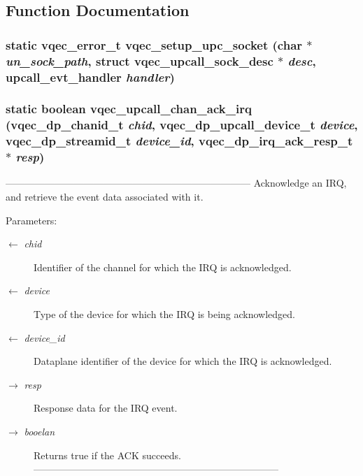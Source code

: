\subsection{Function Documentation}
\subsubsection{\setlength{\rightskip}{0pt plus 5cm}static vqec\_\-error\_\-t vqec\_\-setup\_\-upc\_\-socket (char $\ast$ {\em un\_\-sock\_\-path}, struct \bf{vqec\_\-upcall\_\-sock\_\-desc} $\ast$ {\em desc}, \bf{upcall\_\-evt\_\-handler} {\em handler})\hspace{0.3cm}{\tt  [static]}}\label{vqec__upcall__event_8c_e127266eb30c7584fa785be20ccb6fe5}


\subsubsection{\setlength{\rightskip}{0pt plus 5cm}static boolean vqec\_\-upcall\_\-chan\_\-ack\_\-irq (vqec\_\-dp\_\-chanid\_\-t {\em chid}, vqec\_\-dp\_\-upcall\_\-device\_\-t {\em device}, vqec\_\-dp\_\-streamid\_\-t {\em device\_\-id}, vqec\_\-dp\_\-irq\_\-ack\_\-resp\_\-t $\ast$ {\em resp})\hspace{0.3cm}{\tt  [static]}}\label{vqec__upcall__event_8c_3c5b1ce6d0200d407732d407606fdfb7}


--------------------------------------------------------------------------- Acknowledge an IRQ, and retrieve the event data associated with it.

\begin{Desc}
\item[Parameters:]
\begin{description}
\item[\mbox{$\leftarrow$} {\em chid}]Identifier of the channel for which the IRQ is acknowledged. \item[\mbox{$\leftarrow$} {\em device}]Type of the device for which the IRQ is being acknowledged. \item[\mbox{$\leftarrow$} {\em device\_\-id}]Dataplane identifier of the device for which the IRQ is acknowledged. \item[\mbox{$\rightarrow$} {\em resp}]Response data for the IRQ event. \item[\mbox{$\rightarrow$} {\em booelan}]Returns true if the ACK succeeds. --------------------------------------------------------------------------- \end{description}
\end{Desc}
